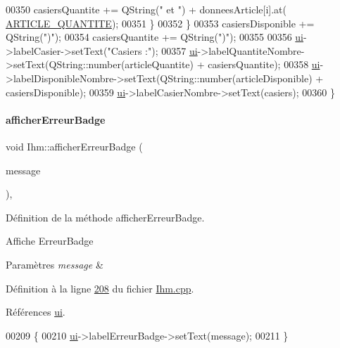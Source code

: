 \begin{DoxyCode}
00350             casiersQuantite += QString(\textcolor{stringliteral}{" et "}) + donneesArticle[i].at(
      \hyperlink{_ihm_8h_ac91f014239536b9bb49d4265ca91d0d5}{ARTICLE\_QUANTITE});
00351         \}
00352     \}
00353     casiersDisponible += QString(\textcolor{stringliteral}{")"});
00354     casiersQuantite += QString(\textcolor{stringliteral}{")"});
00355 
00356     \hyperlink{class_ihm_a0ac5f47856566ceeeca1720109bf70ea}{ui}->labelCasier->setText(\textcolor{stringliteral}{"Casiers :"});
00357     \hyperlink{class_ihm_a0ac5f47856566ceeeca1720109bf70ea}{ui}->labelQuantiteNombre->setText(QString::number(articleQuantite) + casiersQuantite);
00358     \hyperlink{class_ihm_a0ac5f47856566ceeeca1720109bf70ea}{ui}->labelDisponibleNombre->setText(QString::number(articleDisponible) + casiersDisponible);
00359     \hyperlink{class_ihm_a0ac5f47856566ceeeca1720109bf70ea}{ui}->labelCasierNombre->setText(casiers);
00360 \}
\end{DoxyCode}
\mbox{\label{class_ihm_afbfa4f7fcca1b18186a24f1204ae8bbb}} 
\paragraph{\texorpdfstring{afficher\+Erreur\+Badge}{afficherErreurBadge}}
{\footnotesize\ttfamily void Ihm\+::afficher\+Erreur\+Badge (\begin{DoxyParamCaption}\item[{Q\+String}]{message }\end{DoxyParamCaption})\hspace{0.3cm}{\ttfamily [private]}, {\ttfamily [slot]}}



Définition de la méthode afficher\+Erreur\+Badge. 

Affiche Erreur\+Badge 
\begin{DoxyParams}{Paramètres}
{\em message} & \\
\hline
\end{DoxyParams}


Définition à la ligne \hyperlink{_ihm_8cpp_source_l00208}{208} du fichier \hyperlink{_ihm_8cpp_source}{Ihm.\+cpp}.



Références \hyperlink{_ihm_8h_source_l00099}{ui}.


\begin{DoxyCode}
00209 \{
00210     \hyperlink{class_ihm_a0ac5f47856566ceeeca1720109bf70ea}{ui}->labelErreurBadge->setText(message);
00211 \}
\end{DoxyCode}
\mbox{\label{class_ihm_ab6c01e8cc623695d7489be63a4309af7}} 
